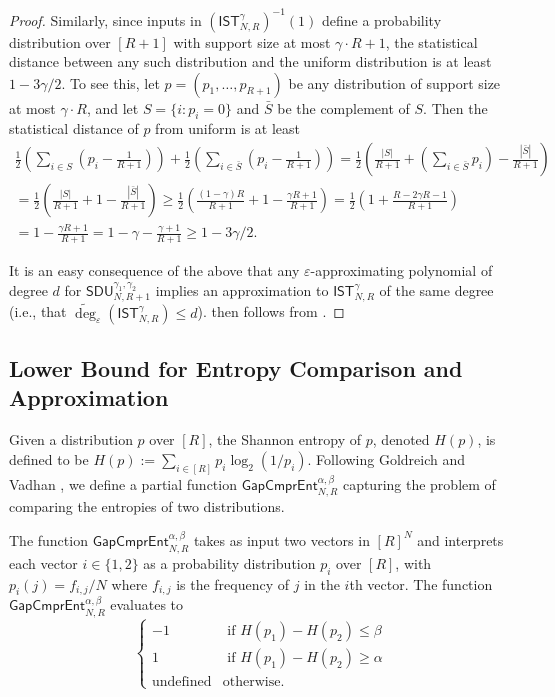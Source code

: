 \documentclass[11pt, letterpaper, fleqn]{article}
\theoremstyle{plain}
\newcommand{\SDU}{\mathsf{ SDU}}
\newcommand{\SE}{\mathsf{ IST}}
\newcommand{\eps}{\varepsilon}
\newcommand{\adeg}{\widetilde{\operatorname{deg}}}
\begin{document}
\begin{proof}
Similarly, since inputs in $\left(\SE_{N, R}^{\gamma}\right)^{-1}(1)$ define a probability distribution over $[R+1]$ with support size at most $\gamma \cdot R +1$, 
the statistical distance between any such distribution and
the uniform distribution is at least 
$1-3\gamma/2$. To see
this, let $p=(p_1, \dots, p_{R+1})$ be any distribution of support size at most $\gamma \cdot R$, and let $S = \{i \colon p_i=0\}$ and $\bar{S}$ be the complement of $S$.
Then the statistical distance of $p$ from uniform is at least 
\begin{align*}
\frac{1}{2} \left(\sum_{i \in S} \left(p_i - \frac{1}{R+1} \right) \right) + 
\frac{1}{2} \left(\sum_{i \in \bar{S}} \left( p_i - \frac{1}{R+1} \right) \right) 
=
\frac{1}{2} \left(\frac{|S|}{R+1} + \left(\sum_{i \in \bar{S}} p_i\right) - \frac{|\bar{S}|}{R+1}\right)\\
= \frac{1}{2} \left(\frac{|S|}{R+1} + 1 - \frac{|\bar{S}|}{R+1}\right)
\geq  \frac{1}{2} \left(\frac{(1-\gamma) R}{R+1} + 1 - \frac{\gamma R + 1}{R+1}\right)
=  \frac{1}{2} \left(1 +  \frac{R-2\gamma R - 1}{R+1}\right)\\
= 1 - \frac{\gamma R + 1}{R+1} = 1 - \gamma - \frac{\gamma + 1}{R+1} \geq 1-3\gamma/2.
\end{align*}

It is an easy consequence of the above that any $\eps$-approximating polynomial of degree $d$
for $\SDU_{N, R+1}^{\gamma_1, \gamma_2}$ implies an approximation to $\SE_{N, R}^{\gamma}$ of the same degree (i.e., that $\adeg_{\eps}(\SE_{N, R}^{\gamma}) \leq d$).
 then follows from .
\end{proof}


\subsection{Lower Bound for Entropy Comparison and Approximation}

Given a distribution $p$ over $[R]$, the Shannon entropy of $p$, denoted $H(p)$,
is defined to be $H(p):=\sum_{i \in [R]} p_i \log_2(1/p_i)$. Following Goldreich and Vadhan \cite{goldreichvadhansurvey}, we define a partial function $\mathsf{GapCmprEnt}_{N, R}^{\alpha, \beta}$ capturing the problem of comparing the entropies of two distributions.

The function $\mathsf{GapCmprEnt}_{N, R}^{\alpha, \beta}$  takes as input two 
vectors in $[R]^N$ and interprets each vector $i \in \{1, 2\}$ as a probability
distribution $p_i$ over $[R]$, with $p_i(j)=f_{i,j}/N$ where $f_{i,j}$ is the frequency of $j$
in the $i$th vector. The function $\mathsf{GapCmprEnt}_{N, R}^{\alpha, \beta}$ evaluates to 
$$\begin{cases}
-1 & \text{ if } H(p_1)-H(p_2) \leq \beta\\
1 & \text{ if } H(p_1)-H(p_2) \geq \alpha \\
\text{undefined} & \text{otherwise}.
\end{cases}
$$
\end{document}
